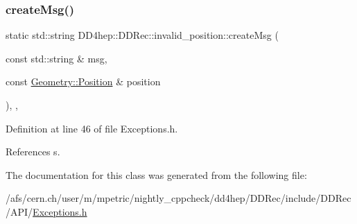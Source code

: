 \subsubsection{\texorpdfstring{create\+Msg()}{createMsg()}}
{\footnotesize\ttfamily static std\+::string D\+D4hep\+::\+D\+D\+Rec\+::invalid\+\_\+position\+::create\+Msg (\begin{DoxyParamCaption}\item[{const std\+::string \&}]{msg,  }\item[{const \hyperlink{namespace_d_d4hep_1_1_geometry_a55083902099d03506c6db01b80404900}{Geometry\+::\+Position} \&}]{position }\end{DoxyParamCaption})\hspace{0.3cm}{\ttfamily [inline]}, {\ttfamily [static]}, {\ttfamily [private]}}



Definition at line 46 of file Exceptions.\+h.



References s.



The documentation for this class was generated from the following file\+:\begin{DoxyCompactItemize}
\item 
/afs/cern.\+ch/user/m/mpetric/nightly\+\_\+cppcheck/dd4hep/\+D\+D\+Rec/include/\+D\+D\+Rec/\+A\+P\+I/\hyperlink{_d_d_rec_2include_2_d_d_rec_2_a_p_i_2_exceptions_8h}{Exceptions.\+h}\end{DoxyCompactItemize}

